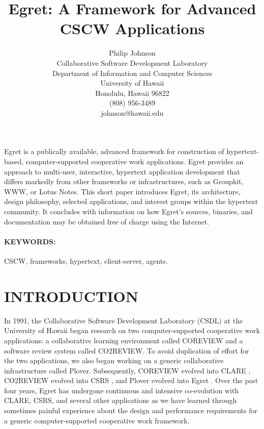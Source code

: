 


\title{Egret: A Framework for Advanced CSCW Applications}

\author{
Philip Johnson\\
Collaborative Software Development Laboratory\\
Department of Information and Computer Sciences\\
University of Hawaii\\
Honolulu, Hawaii 96822\\
(808) 956-3489\\
johnson@hawaii.edu}

\maketitle

\abstract 

Egret is a publically available, advanced framework for construction of
hypertext-based, computer-supported cooperative work applications.  Egret
provides an approach to multi-user, interactive, hypertext application
development that differs markedly from other frameworks or infrastructures,
such as Groupkit, WWW, or Lotus Notes.  This short paper introduces Egret,
its architecture, design philosophy, selected applications, and interest
groups within the hypertext community. It concludes with information on how
Egret's sources, binaries, and documentation may be obtained free of charge
using the Internet.


\paragraph{KEYWORDS:} CSCW, frameworks, hypertext, client-server, agents.

\section{INTRODUCTION}

In 1991, the Collaborative Software Development Laboratory (CSDL) at the
University of Hawaii began research on two computer-supported cooperative
work applications: a collaborative learning environment called COREVIEW and
a software review system called CO2REVIEW.  To avoid duplication of effort
for the two applications, we also began working on a generic collaborative
infrastructure called Plover.  Subsequently, COREVIEW evolved into CLARE
\cite{csdl-94-04}, CO2\-REVIEW evolved into CSRS \cite{csdl-93-17}, and
Plover evolved into Egret \cite{csdl-93-09}.  Over the past four years,
Egret has undergone continuous and intensive co-evolution with CLARE, CSRS,
and several other applications as we have learned through sometimes painful
experience about the design and performance requirements for a generic
computer-supported cooperative work framework.

